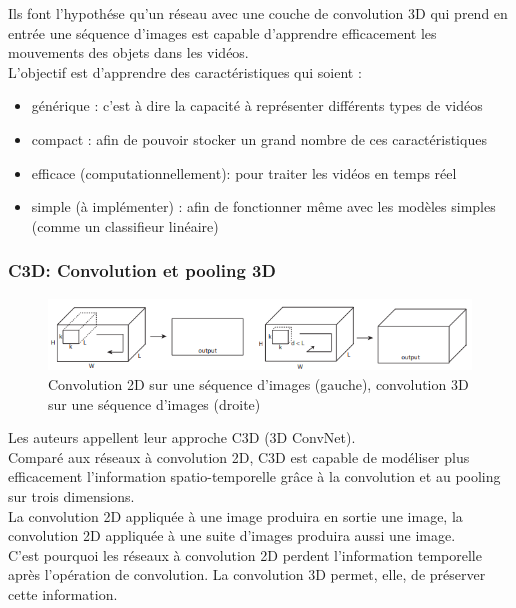 \documentclass[11pt]{article}
\begin{document}
Ils font l'hypothése qu'un réseau avec une couche de convolution 3D qui prend en entrée une séquence d'images est capable d'apprendre efficacement les mouvements des objets dans les vidéos.\\

L'objectif est d'apprendre des caractéristiques qui soient :\\
\begin{itemize}
\item générique : c'est à dire la capacité à représenter différents types de vidéos\\
\item compact : afin de pouvoir stocker un grand nombre de ces caractéristiques\\
\item efficace (computationnellement): pour traiter les vidéos en temps réel\\
\item simple (à implémenter) : afin de fonctionner même avec les modèles simples (comme un classifieur linéaire)\\
\end{itemize}

\subsubsection{C3D: Convolution et pooling 3D}
\label{sec:org6e23567}
\begin{figure}[htbp]
\centering
\includegraphics[width=.9\linewidth]{c3d_idea.png}
\caption{Convolution 2D sur une séquence d'images (gauche), convolution 3D sur une séquence d'images (droite) \label{c3d-idea}}
\end{figure}
Les auteurs appellent leur approche C3D (3D ConvNet).\\
Comparé aux réseaux à convolution 2D, C3D est capable de modéliser plus efficacement l'information spatio-temporelle grâce à la convolution et au pooling sur trois dimensions.\\
La convolution 2D appliquée à une image produira en sortie une image, la convolution 2D appliquée à une suite d'images produira aussi une image.\\
C'est pourquoi les réseaux à convolution 2D perdent l'information temporelle après l'opération de convolution. La convolution 3D permet, elle, de préserver cette information.\\
\end{document}
